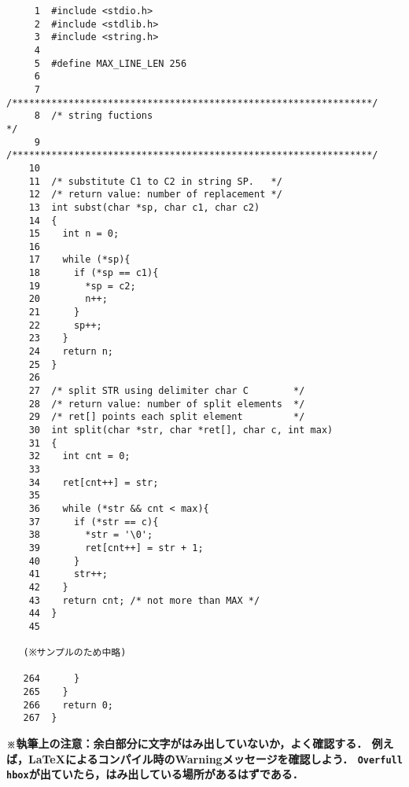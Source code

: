 \documentclass[a4j,11pt]{jarticle}
\begin{document}
%
%
{\fontsize{10pt}{11pt} \selectfont
\begin{verbatim}
     1	#include <stdio.h>
     2	#include <stdlib.h>
     3	#include <string.h>
     4	
     5	#define MAX_LINE_LEN 256
     6	
     7	/****************************************************************/
     8	/* string fuctions                                              */
     9	/****************************************************************/
    10	
    11	/* substitute C1 to C2 in string SP.   */
    12	/* return value: number of replacement */
    13	int subst(char *sp, char c1, char c2)
    14	{
    15	  int n = 0;
    16	
    17	  while (*sp){
    18	    if (*sp == c1){
    19	      *sp = c2;
    20	      n++;
    21	    }
    22	    sp++;
    23	  }
    24	  return n;
    25	}
    26	
    27	/* split STR using delimiter char C        */
    28	/* return value: number of split elements  */
    29	/* ret[] points each split element         */
    30	int split(char *str, char *ret[], char c, int max)
    31	{
    32	  int cnt = 0;
    33	
    34	  ret[cnt++] = str;
    35	
    36	  while (*str && cnt < max){
    37	    if (*str == c){
    38	      *str = '\0';
    39	      ret[cnt++] = str + 1;
    40	    }
    41	    str++;
    42	  }
    43	  return cnt; /* not more than MAX */
    44	}
    45	

   (※サンプルのため中略)

   264	    }
   265	  }
   266	  return 0;
   267	}
\end{verbatim}
}

\textbf{\small ※執筆上の注意：余白部分に文字がはみ出していないか，よく確認する．
    例えば，\LaTeX によるコンパイル時のWarningメッセージを確認しよう．
    \texttt{Overfull hbox}が出ていたら，はみ出している場所があるはずである．}
\end{document}
